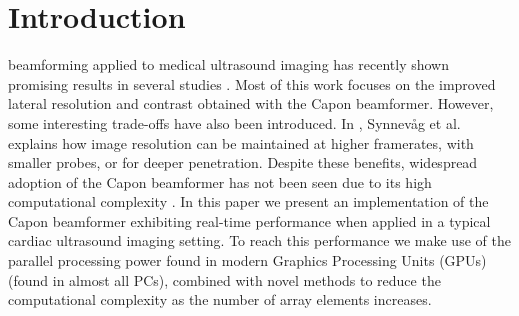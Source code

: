 \documentclass[journal]{IEEEtran}
\begin{document}
%
\IEEEpeerreviewmaketitle



\section{Introduction}
% 
% 
% 
% 

 beamforming \cite{Capon1969} applied to medical ultrasound imaging has recently shown promising results in several studies \cite{Synnevag2007, Austeng2008, Vignon2008, Viola, Mehdizadeh2012}. Most of this work focuses on the improved lateral resolution and contrast obtained with the Capon beamformer. However, some interesting trade-offs have also been introduced. In \cite{Synnevag2009}, Synnev\aa{}g et al. explains how image resolution can be maintained at higher framerates, with smaller probes, or for deeper penetration. Despite these benefits, widespread adoption of the Capon beamformer has not been seen due to its high computational complexity \cite{So2011}. In this paper we present an implementation of the Capon beamformer exhibiting real-time performance when applied in a typical cardiac ultrasound imaging setting. To reach this performance we make use of the parallel processing power found in modern Graphics Processing Units (GPUs) (found in almost all PCs), combined with novel methods to reduce the computational complexity as the number of array elements increases. 
\end{document}
